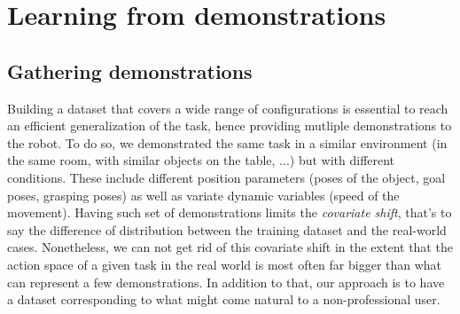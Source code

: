 \documentclass[conference]{IEEEtran}
\begin{document}

\section{Learning from demonstrations}\label{LfD}

\subsection{Gathering demonstrations}


Building a dataset that covers a wide range of configurations is essential to reach an efficient generalization of the task, hence providing mutliple demonstrations to the robot. To do so, we demonstrated the same task in a similar environment (in the same room, with similar objects on the table, ...) but with different conditions. These include different position parameters (poses of the object, goal poses, grasping poses) as well as variate dynamic variables (speed of the movement). Having such set of demonstrations limits the \textit{covariate  shift}, that's to say the difference of distribution between the training dataset and the real-world cases. Nonetheless, we can not get rid of  this covariate shift in the extent that the action space of a given task in the real world is most often far bigger than what can represent a few demonstrations. In addition to that, our approach is to have a dataset corresponding to what might come natural to a non-professional user.
\end{document}
